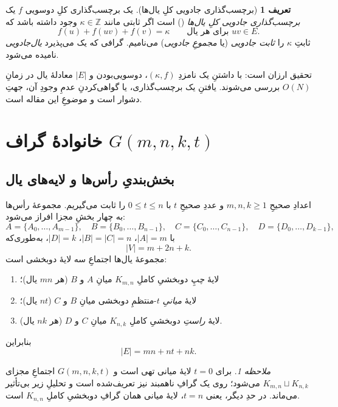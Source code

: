 \documentclass[11pt,a4paper]{article}
\newcommand{\en}[1]{\lr{{\enfont #1}}}
\newcommand{\Z}{\mathbb{Z}}
\newcommand{\km}{\kappa}
\newcommand{\Gfam}{G(m,n,k,t)}
\theoremstyle{plain}
\theoremstyle{definition}
\newtheorem{definition}{تعریف}
\theoremstyle{remark}
\newtheorem*{remark}{ملاحظه}
\begin{document}
\begin{definition}[برچسب‌گذاری جادویی کلِ یال‌ها]\label{def:emtl}
یک برچسب‌گذاری کلِ دوسویی $f$ یک \emph{برچسب‌گذاری جادویی کلِ یال‌ها} (\en{EMTL})
است اگر ثابتی مانند $\km\in\Z$ وجود داشته باشد که
\[
  f(u)+f(uv)+f(v)=\km \qquad\text{برای هر یال } uv\in E .
\]
ثابتِ $\km$ را \emph{ثابت جادویی} (یا \emph{مجموعِ جادویی}) می‌نامیم. گرافی که یک
\en{EMTL} می‌پذیرد \emph{یال‌جادویی} نامیده می‌شود.
\end{definition}

تحقیق ارزان است: با داشتنِ یک نامزدِ $(\km,f)$، دوسویی‌بودن و $|E|$ معادلهٔ یال در
زمانِ $O(N)$ بررسی می‌شوند. یافتنِ یک برچسب‌گذاری، یا گواهی‌کردنِ عدمِ وجودِ آن، جهتِ
دشوار است و موضوعِ این مقاله است.

\section{خانوادهٔ گراف \texorpdfstring{$G(m,n,k,t)$}{G(m,n,k,t)}}\label{sec:family}

\subsection{بخش‌بندیِ رأس‌ها و لایه‌های یال}

اعدادِ صحیحِ $m,n,k\ge 1$ و عددِ صحیحِ $t$ با $0\le t\le n$ را ثابت می‌گیریم. مجموعهٔ
رأس‌ها به چهار بخشِ مجزا افراز می‌شود:
\[
  A=\{A_0,\dots,A_{m-1}\},\quad
  B=\{B_0,\dots,B_{n-1}\},\quad
  C=\{C_0,\dots,C_{n-1}\},\quad
  D=\{D_0,\dots,D_{k-1}\},
\]
با $|A|=m$، $|B|=|C|=n$، $|D|=k$، به‌طوری‌که
\begin{equation}\label{eq:Vcount}
  |V| = m + 2n + k .
\end{equation}
مجموعهٔ یال‌ها اجتماعِ سه لایهٔ دوبخشی است:
\begin{enumerate}[label=(\arabic*),itemsep=1pt]
  \item لایهٔ \emph{چپِ} دوبخشیِ کاملِ $K_{m,n}$ میانِ $A$ و $B$ (هر $mn$ یال)؛
  \item لایهٔ \emph{میانیِ} $t$-منتظمِ دوبخشی میانِ $B$ و $C$ ($nt$ یال)؛
  \item لایهٔ \emph{راستِ} دوبخشیِ کاملِ $K_{n,k}$ میانِ $C$ و $D$ (هر $nk$ یال).
\end{enumerate}
بنابراین
\begin{equation}\label{eq:Ecount}
  |E| = mn + nt + nk .
\end{equation}

\begin{remark}\label{rem:boundary}
برای $t=0$ لایهٔ میانی تهی است و $\Gfam$ اجتماعِ مجزای $K_{m,n}\sqcup K_{n,k}$ می‌شود؛
\en{EMTL} روی یک گرافِ ناهمبند نیز تعریف‌شده است و تحلیلِ زیر بی‌تأثیر می‌ماند. در حدِ
دیگر، یعنی $t=n$، لایهٔ میانی همان گرافِ دوبخشیِ کاملِ $K_{n,n}$ است.
\end{remark}
\end{document}
